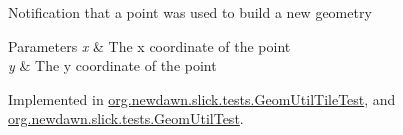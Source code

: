 Notification that a point was used to build a new geometry


\begin{DoxyParams}{Parameters}
{\em x} & The x coordinate of the point \\
\hline
{\em y} & The y coordinate of the point \\
\hline
\end{DoxyParams}


Implemented in \mbox{\hyperlink{classorg_1_1newdawn_1_1slick_1_1tests_1_1_geom_util_tile_test_a2aa4aae6b4ebaa2062067311ad02d129}{org.\+newdawn.\+slick.\+tests.\+Geom\+Util\+Tile\+Test}}, and \mbox{\hyperlink{classorg_1_1newdawn_1_1slick_1_1tests_1_1_geom_util_test_a9a79bf3f2f9433b99402f42c34daf4c9}{org.\+newdawn.\+slick.\+tests.\+Geom\+Util\+Test}}.


